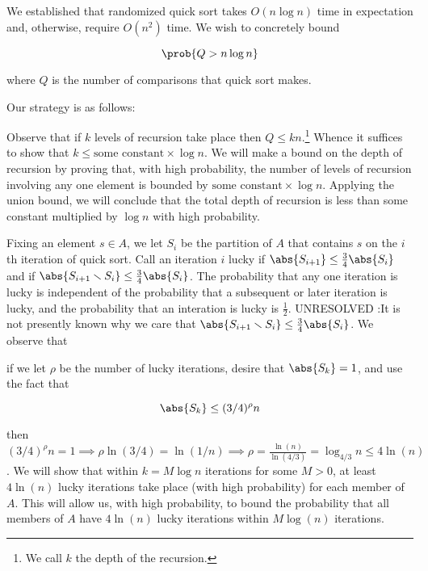 \documentclass[../main.tex]{subfiles}
\begin{document}
\begin{example}
    We established that randomized quick sort takes $O(n \log n)$ time in expectation and, otherwise, require $O(n^2)$ time. We wish to concretely bound

    \[
        \prob{Q > n \log n}
    \]

    where $Q$ is the number of comparisons that quick sort makes.

    Our strategy is as follows:
    \begin{outline}
        \1 Observe that if $k$ levels of recursion take place then $Q \leq kn$.\footnote{We call $k$ the depth of the recursion.} 
        \2 Whence it suffices to show that $k \leq \text{some constant} \times \log n$.
        \1 We will make a bound on the depth of recursion by proving that, with high probability, the number of levels of recursion involving any one element is bounded by $\text{some constant} \times \log n$.
        \1 Applying the union bound, we will conclude that the total depth of recursion is less than some constant multiplied by $\log n$ with high probability.
    \end{outline}

    Fixing an element $s \in A$, we let $S_{i}$ be the partition of $A$ that contains $s$ on the $i$th iteration of quick sort. Call an iteration $i$ lucky if $\abs{S_{i+1}} \leq \frac{3}{4}\abs{S_{i}}$ and if $\abs{S_{i+1} \smallsetminus S_{i}} \leq \frac{3}{4}\abs{S_{i}}$. The probability that any one iteration is lucky is independent of the probability that a subsequent or later iteration is lucky, and the probability that an interation is lucky is $\frac{1}{2}$. UNRESOLVED :It is not presently known why we care that $\abs{S_{i+1} \smallsetminus S_{i}} \leq \frac{3}{4}\abs{S_{i}}$. We observe that
    
    if we let $\rho$ be the number of lucky iterations, desire that $\abs{S_{k}} = 1$, and use the fact that

    \[
        \abs{S_{k}} \leq (3/4)^\rho n
    \]

    then $(3/4)^\rho n = 1 \implies \rho \ln(3/4) = \ln(1/n) \implies \rho = \frac{\ln(n)}{\ln(4/3)} = \log_{4/3} n \leq 4 \ln(n)$. We will show that within $k = M \log n$ iterations for some $M > 0$, at least $4 \ln (n)$ lucky iterations take place (with high probability) for each member of $A$. This will allow us, with high probability, to bound the probability that all members of $A$ have $4 \ln (n)$ lucky iterations within $M \log(n)$ iterations.


\end{example}
\end{document}
